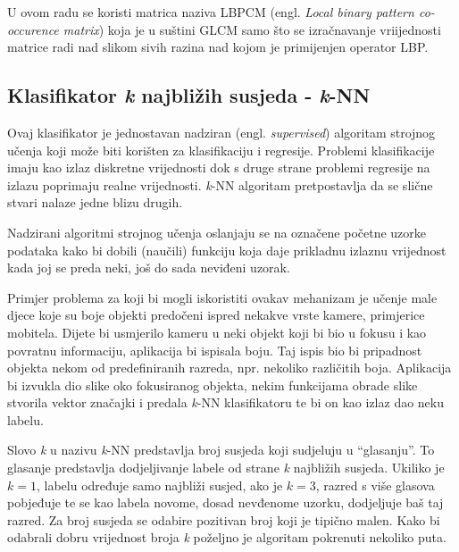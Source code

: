 \documentclass[times, utf8, zavrsni]{fer}
\begin{document}
U ovom radu se koristi matrica naziva LBPCM (engl. \textit{Local binary pattern co-occurence matrix})
koja je u suštini GLCM samo što se izračnavanje vriijednosti matrice 
radi nad slikom sivih razina nad kojom je primijenjen operator LBP.

\newpage

\subsection{Klasifikator \textit{k} najbližih susjeda - \textit{k}-NN}

Ovaj klasifikator je jednostavan nadziran (engl. \textit{supervised})
algoritam strojnog učenja koji može biti korišten za klasifikaciju
i regresije. Problemi klasifikacije imaju kao izlaz diskretne vrijednosti
dok s druge strane problemi regresije na izlazu poprimaju realne vrijednosti.
\textit{k}-NN algoritam pretpostavlja da se slične stvari nalaze 
jedne blizu drugih.

\bigbreak

Nadzirani algoritmi strojnog učenja oslanjaju se na označene početne uzorke
podataka kako bi dobili (naučili) funkciju koja daje prikladnu izlaznu vrijednost
kada joj se preda neki, još do sada neviđeni uzorak. 

\bigbreak

Primjer problema 
za koji bi mogli iskoristiti ovakav mehanizam je učenje male djece koje su boje
objekti predočeni ispred nekakve vrste kamere, primjerice mobitela. Dijete
bi usmjerilo kameru u neki objekt koji bi bio u fokusu i kao povratnu informaciju,
aplikacija bi ispisala boju. Taj ispis bio bi pripadnost objekta nekom od predefiniranih 
razreda, npr. nekoliko različitih boja. Aplikacija bi izvukla 
dio slike oko fokusiranog objekta, nekim funkcijama obrade slike stvorila
vektor značajki i predala \textit{k}-NN klasifikatoru te bi on kao izlaz dao 
neku labelu. 

\bigbreak

Slovo \textit{k} u nazivu \textit{k}-NN predstavlja broj susjeda koji sudjeluju
u \enquote{glasanju}. To glasanje predstavlja dodjeljivanje labele od strane \textit{k}
najbližih susjeda. Ukiliko je \(k=1\), labelu određuje samo najbliži susjed,
ako je \(k=3\), razred s više glasova pobjeđuje te se kao labela novome, dosad
nevđenome uzorku, dodjeljuje baš taj razred. Za broj susjeda se odabire pozitivan
broj koji je tipično malen. Kako bi odabrali dobru vrijednost broja \textit{k} poželjno
je algoritam pokrenuti nekoliko puta. 
\end{document}
